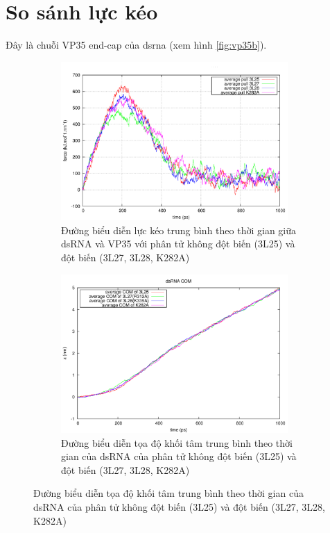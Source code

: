 \documentclass[12pt,a4paper,reqno, oneside]{book}
\begin{document}
\section{So sánh lực kéo}
Đây là chuỗi VP35 end-cap của \gls{dsrna} (xem hình \ref{fig:vp35b}).
	\begin{figure}[h]
	\centering
	\begin{subfigure}{0.95\textwidth}
	\includegraphics[width=0.95\textwidth,natwidth=610,natheight=642]{pullf}
	\caption{Đường biểu diễn lực kéo trung bình theo thời gian giữa dsRNA và VP35 với phân tử không đột biến (3L25) và đột biến (3L27, 3L28, \gls{K282A})}
	\label{pullft}
	\end{subfigure}
	\begin{subfigure}{0.95\textwidth}
	\centering
	\includegraphics[width=0.95\textwidth,natwidth=610,natheight=642]{pullx}
	\caption{Đường biểu diễn tọa độ khối tâm trung bình theo thời gian của dsRNA của phân tử không đột biến (3L25) và đột biến (3L27, 3L28, \gls{K282A})}
	\label{pullxt}
	\end{subfigure}
	\label{}
	\end{figure}
\end{document}
